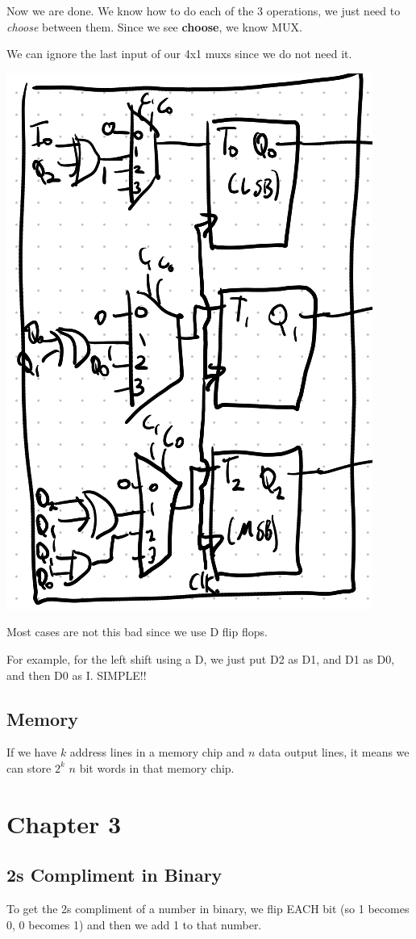 \documentclass[12pt,letterpaper]{article} \usepackage{amsmath} \usepackage{graphicx} \usepackage[margin=1in]{geometry} \usepackage{longtable}  \usepackage{amssymb}
\begin{document}
\begin{mdframed}[]
		Now we are done. We know how to do each of the 3 operations, we just need to \emph{choose} between them. Since we see \textbf{choose}, we know MUX.
		
		We can ignore the last input of our 4x1 muxs since we do not need it. 
		
		\begin{center}
		\includegraphics[width=0.5\linewidth]{ex2}
		\end{center}
		
		Most cases are not this bad since we use D flip flops. 
		
		For example, for the left shift using a D, we just put D2 as D1, and D1 as D0, and then D0 as I. SIMPLE!!
		\end{mdframed}
		
		\subsection{Memory}
		If we have $k$ address lines in a memory chip and $n$ data output lines, it means we can store $2^k$ $n$ bit words in that memory chip.
		
		
		\section{Chapter 3}
		\subsection{2s Compliment in Binary}
		To get the 2s compliment of a number in binary, we flip EACH bit (so 1 becomes 0, 0 becomes 1) and then we add 1 to that number. 
		
\end{document}

